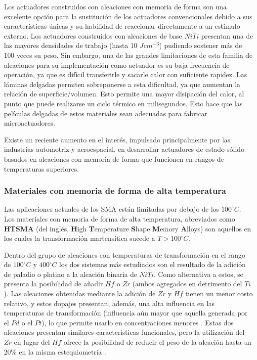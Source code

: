 \documentclass[12pt]{article}
\theoremstyle{definition}
\theoremstyle{remark}
\begin{document}
Los actuadores construidos con aleaciones con memoria de forma son una excelente opción para la sustitución de los actuadores convencionales debido a sus características únicas y su habilidad de reaccionar directamente a un estímulo externo. Los actuadores construidos con aleaciones de base $NiTi$ presentan una de las mayores densidades de trabajo (hasta 10 $J cm^{-3}$) pudiendo sostener más de 100 veces su peso. Sin embargo, una de las grandes limitaciones de esta familia de aleaciones para su implementación como actuador es su baja frecuencia de operación, ya que es difícil transferirle y sacarle calor con suficiente rapidez. Las láminas delgadas permiten sobreponerse a esta dificultad, ya que aumentan la relación de superficie/volumen. Esto permite una mayor disipación del calor, al punto que puede realizarse un ciclo térmico en milisegundos. Esto hace que las películas delgadas de estos materiales sean adecuadas para fabricar microactuadores\cite{ThinFilm}.

Existe un reciente aumento en el interés, impulsado principalmente por las industrias automotriz y aeroespacial, en desarrollar actuadores de estado sólido basados en aleaciones con memoria de forma que funcionen en rangos de temperaturas superiores.

\subsubsection{Materiales con memoria de forma de alta temperatura}

Las aplicaciones actuales de los SMA están limitadas por debajo de los $100^\circ C$. Los materiales con memoria de forma de alta temperatura, abreviados como \textbf{HTSMA} (del inglés, \textbf{H}igh \textbf{T}emperature \textbf{S}hape \textbf{M}emory \textbf{A}lloys) son aquellos en los cuales la transformación martensítica sucede a $T > 100^\circ C$.

Dentro del grupo de aleaciones con temperaturas de transformación en el rango de $100^\circ C$ y $400^\circ C$ los dos sistemas más estudiados son el resultado de la adición de paladio o platino a la aleación binaria de $NiTi$. Como alternativa a estos, se presenta la posibilidad de añadir $Hf$ o $Zr$ (ambos agregados en detrimento del $Ti$)\cite{HTSMA}. Las aleaciones obtenidas mediante la adición de $Zr$ y $Hf$ tienen un menor costo relativo, y estos dopajes presentan, además, una alta influencia en las temperaturas de transformación (influencia aún mayor que aquella generada por el $Pd$ o el $Pt$), lo que permite usarlo en concentraciones menores \cite{HTSMA}. Estas dos aleaciones presentan similares características funcionales, pero la utilización del $Zr$ en lugar del $Hf$ ofrece la posibilidad de reducir el peso de la aleación hasta un 20\% en la misma estequiometría \cite{Evirgen2013}.
\end{document}
